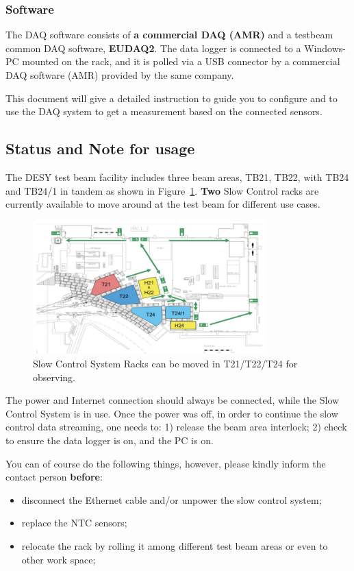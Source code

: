 \documentclass[a4paper,12pt]{scrartcl}
\begin{document}
\subsubsection*{Software}
The DAQ software consists of \textbf{a commercial DAQ (AMR)} and a testbeam common DAQ software, \textbf{EUDAQ2}.
The data logger is connected to a Windows-PC mounted on the rack, and it is polled via a USB connector by a commercial DAQ software (AMR) provided by the same company.

This document will give a detailed instruction to guide you to configure and to use the DAQ system to get a measurement based on the connected sensors.

\subsection{Status and Note for usage}
The DESY test beam facility includes three beam areas, TB21, TB22, with TB24 and TB24/1 in tandem as shown in Figure~\ref{fig:desytb}. \textbf{Two} Slow Control racks are currently available to move around at the test beam for different use cases.

\begin{figure}[!ht]
  \centering
  \includegraphics[width=0.8\textwidth]{Testbeam.png}
\caption{Slow Control System Racks can be moved in T21/T22/T24 for observing.}
\label{fig:desytb}
\end{figure}

The power and Internet connection should always be connected, while the Slow Control System is in use. Once the power was off, in order to continue the slow control data streaming, one needs to: 1) release the beam area interlock; 2) check to ensure the data logger is on, and the PC is on.

You can of course do the following things, however, please kindly inform the contact person \textbf{before}:
\begin{itemize}
  \item disconnect the Ethernet cable and/or unpower the slow control system;
  \item replace the NTC sensors;
  \item relocate the rack by rolling it among different test beam areas or even to other work space;
\end{itemize}
\end{document}

